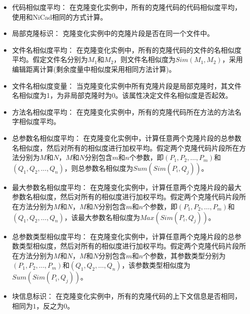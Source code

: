 \begin{itemize}
\item
代码相似度平均：
在克隆变化实例中，所有的克隆代码的代码相似度平均，使用和NiCad相同的方式计算\cite{roy2008nicad}。
\item
局部克隆标识：
克隆变化实例中的克隆片段是否在同一个文件中。
\item
文件名相似度平均：
在克隆变化实例中，所有的克隆代码的文件的名相似度平均。假定文件名分别为$M_1$和$M_2$，则文件名相似度为$Sim(M_1,M_2)$，采用编辑距离\cite{levenshtein1966binary}计算(剩余度量中相似度采用相同方法计算)。
\item
文件名相似度变量：
当克隆变化实例中所有克隆片段是局部克隆时，其文件名相似度为1，为非局部克隆时为0。该属性决定文件名相似度是否起效。
\item
方法名相似度平均：
在克隆变化实例中，所有的克隆代码所在方法的方法名字相似度平均。
\item
总参数名相似度平均：
在克隆变化实例中，计算任意两个克隆片段的总参数名相似度，然后对所有的相似度进行加权平均。假定两个克隆代码片段所在方法分别为$M$和$N$，$M$和$N$分别包含$m$和$n$个参数，即$(P_1,P_2,…,P_m)$和$(Q_1,Q_2,…,Q_n)$，则总参数名相似度为$Sum(Sim(P_i,Q_j))$。
\item
最大参数名相似度平均：
在克隆变化实例中，计算任意两个克隆片段的最大参数名相似度，然后对所有的相似度进行加权平均。假定两个克隆代码片段所在方法分别为$M$和$N$，$M$和$N$分别包含$m$和$n$个参数，即$(P_1,P_2,…,P_m)$和$(Q_1,Q_2,…,Q_n)$，该最大参数名相似度为$Max(Sim(P_i,Q_j))$。
\item 
总参数类型相似度平均：
在克隆变化实例中，计算任意两个克隆片段的总参数类型相似度，然后对所有的相似度进行加权平均。假定两个克隆代码片段所在方法分别为$M$和$N$，$M$和$N$分别包含$m$和$n$个参数，其参数类型分别为$(P_1,P_2,…,P_m)$和$(Q_1,Q_2,…,Q_n)$，该参数类型相似度为$Sum(Sim(P_i,Q_j))$。
\item
块信息标识：
在克隆变化实例中，所有的克隆代码的上下文信息是否相同，相同为$1$，反之为$0$。
\end{itemize}


